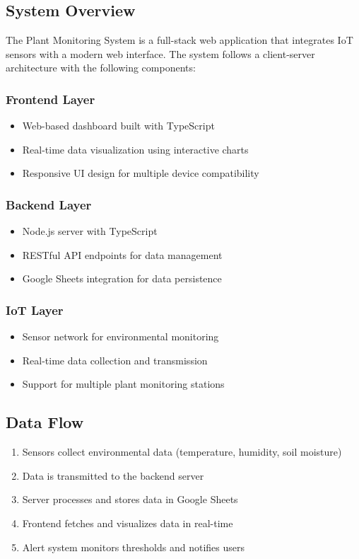 \documentclass[12pt,a4paper]{article}
\begin{document}
\subsection{System Overview}
The Plant Monitoring System is a full-stack web application that integrates IoT sensors with a modern web interface. The system follows a client-server architecture with the following components:

\subsubsection{Frontend Layer}
\begin{itemize}[leftmargin=*]
    \item Web-based dashboard built with TypeScript
    \item Real-time data visualization using interactive charts
    \item Responsive UI design for multiple device compatibility
\end{itemize}

\subsubsection{Backend Layer}
\begin{itemize}[leftmargin=*]
    \item Node.js server with TypeScript
    \item RESTful API endpoints for data management
    \item Google Sheets integration for data persistence
\end{itemize}

\subsubsection{IoT Layer}
\begin{itemize}[leftmargin=*]
    \item Sensor network for environmental monitoring
    \item Real-time data collection and transmission
    \item Support for multiple plant monitoring stations
\end{itemize}

\subsection{Data Flow}
\begin{enumerate}[leftmargin=*]
    \item Sensors collect environmental data (temperature, humidity, soil moisture)
    \item Data is transmitted to the backend server
    \item Server processes and stores data in Google Sheets
    \item Frontend fetches and visualizes data in real-time
    \item Alert system monitors thresholds and notifies users
\end{enumerate}
\end{document}

